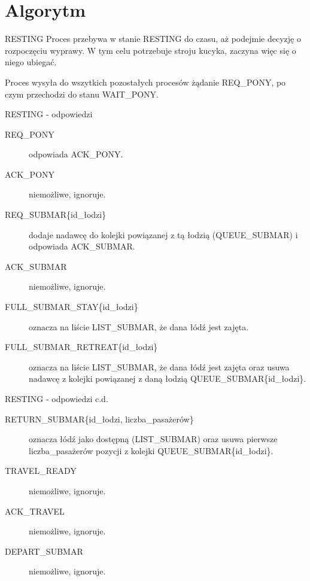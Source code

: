 \documentclass{beamer}
\begin{document}
\section{Algorytm}
\begin{frame}{RESTING}
    \internallinenumbers
    \resetlinenumber[1]
    Proces przebywa w stanie RESTING do czasu, aż podejmie decyzję o rozpoczęciu wyprawy. W tym celu potrzebuje stroju kucyka, zaczyna więc się o niego ubiegać.
    
    \vspace{0.4cm}
    Proces wysyła do wszytkich pozostałych procesów żądanie REQ\_PONY, po czym przechodzi do stanu WAIT\_PONY.
\end{frame}

\begin{frame}{RESTING - odpowiedzi}
    \internallinenumbers
    \resetlinenumber[1]
    \begin{description}
        \item [REQ\_PONY] odpowiada ACK\_PONY.
        \item [ACK\_PONY] niemożliwe, ignoruje.
        \item [REQ\_SUBMAR\{id\_łodzi\}] dodaje nadawcę do kolejki powiązanej z tą łodzią (QUEUE\_SUBMAR) i odpowiada ACK\_SUBMAR.
        \item [ACK\_SUBMAR] niemożliwe, ignoruje.
        \item [FULL\_SUBMAR\_STAY\{id\_łodzi\}] oznacza na liście LIST\_SUBMAR, że dana łódź jest zajęta.
        \item [FULL\_SUBMAR\_RETREAT\{id\_łodzi\}] oznacza na liście LIST\_SUBMAR, że dana łódź jest zajęta oraz usuwa nadawcę z kolejki powiązanej z daną łodzią QUEUE\_SUBMAR\{id\_łodzi\}.
    \end{description}
\end{frame}

\begin{frame}{RESTING - odpowiedzi c.d.}
    \internallinenumbers
    \resetlinenumber[1]
    \begin{description}
        \item [RETURN\_SUBMAR\{id\_łodzi, liczba\_pasażerów\}] oznacza łódź jako dostępną (LIST\_SUBMAR) oraz usuwa pierwsze liczba\_pasażerów pozycji z kolejki QUEUE\_SUBMAR\{id\_łodzi\}.
        \item [TRAVEL\_READY] niemożliwe, ignoruje.
        \item [ACK\_TRAVEL] niemożliwe, ignoruje.
        \item [DEPART\_SUBMAR] niemożliwe, ignoruje.
    \end{description}
\end{frame}
\end{document}

